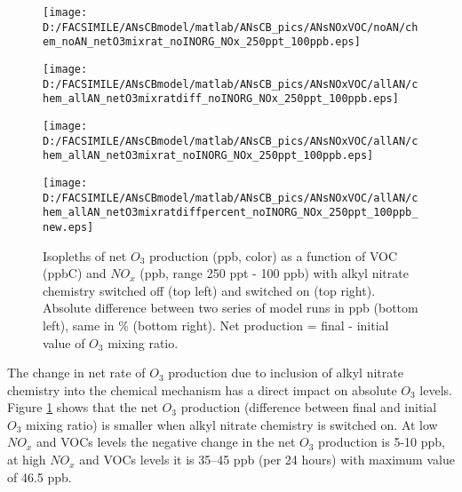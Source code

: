 \documentclass[11pt,a4paper]{article}
\begin{document}
\begin{figure}[h] %
\centering
\begin{minipage}{.45\textwidth} %
  \centering
  \texttt{[image: D:/FACSIMILE/ANsCBmodel/matlab/ANsCB\_pics/ANsNOxVOC/noAN/chem\_noAN\_netO3mixrat\_noINORG\_NOx\_250ppt\_100ppb.eps]}
\end{minipage}
\begin{minipage}{.45\textwidth} %
  \centering
  \texttt{[image: D:/FACSIMILE/ANsCBmodel/matlab/ANsCB\_pics/ANsNOxVOC/allAN/chem\_allAN\_netO3mixratdiff\_noINORG\_NOx\_250ppt\_100ppb.eps]}
\end{minipage}
\begin{minipage}{.45\textwidth} %
  \centering
  \texttt{[image: D:/FACSIMILE/ANsCBmodel/matlab/ANsCB\_pics/ANsNOxVOC/allAN/chem\_allAN\_netO3mixrat\_noINORG\_NOx\_250ppt\_100ppb.eps]}
\end{minipage}
\begin{minipage}{.45\textwidth} %
  \centering
  \texttt{[image: D:/FACSIMILE/ANsCBmodel/matlab/ANsCB\_pics/ANsNOxVOC/allAN/chem\_allAN\_netO3mixratdiffpercent\_noINORG\_NOx\_250ppt\_100ppb\_new.eps]}
\end{minipage}
\caption{Isopleths of net $O_3$ production (ppb, color) as a function of VOC (ppbC) and $NO_x$ (ppb, range 250 ppt - 100 ppb) with alkyl nitrate chemistry switched off (top left) and switched on (top right). Absolute difference between two series of model runs in ppb (bottom left), same in \% (bottom right). Net production = final - initial value of $O_3$ mixing ratio.}\label{fig:netO3mixrat_noAN_withAN_diff}
\end{figure}

The change in net rate of $O_3$ production due to inclusion of alkyl nitrate chemistry into the chemical mechanism has a direct impact on absolute $O_3$ levels. Figure \ref{fig:netO3mixrat_noAN_withAN_diff} shows that the net $O_3$ production (difference between final and initial $O_3$ mixing ratio) is smaller when alkyl nitrate chemistry is switched on. At low $NO_x$ and VOCs levels the negative change in the net $O_3$ production is 5-10 ppb, at high $NO_x$ and VOCs levels it is 35--45 ppb (per 24 hours) with maximum value of 46.5 ppb.
\end{document}
